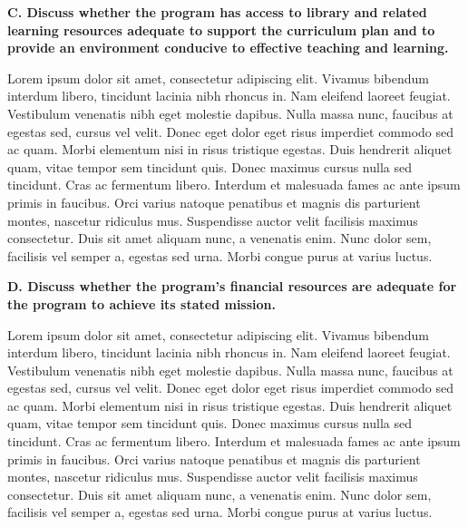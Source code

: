 \textbf{C. Discuss whether the program has access to library and related learning resources adequate to support the curriculum plan and to provide an environment conducive to effective teaching and learning.}

Lorem ipsum dolor sit amet, consectetur adipiscing elit. Vivamus bibendum interdum libero, tincidunt lacinia nibh rhoncus in. Nam eleifend laoreet feugiat. Vestibulum venenatis nibh eget molestie dapibus. Nulla massa nunc, faucibus at egestas sed, cursus vel velit. Donec eget dolor eget risus imperdiet commodo sed ac quam. Morbi elementum nisi in risus tristique egestas. Duis hendrerit aliquet quam, vitae tempor sem tincidunt quis. Donec maximus cursus nulla sed tincidunt. Cras ac fermentum libero. Interdum et malesuada fames ac ante ipsum primis in faucibus. Orci varius natoque penatibus et magnis dis parturient montes, nascetur ridiculus mus. Suspendisse auctor velit facilisis maximus consectetur. Duis sit amet aliquam nunc, a venenatis enim. Nunc dolor sem, facilisis vel semper a, egestas sed urna. Morbi congue purus at varius luctus. 

\textbf{D. Discuss whether the program’s financial resources are adequate for the program to achieve its stated mission.}

Lorem ipsum dolor sit amet, consectetur adipiscing elit. Vivamus bibendum interdum libero, tincidunt lacinia nibh rhoncus in. Nam eleifend laoreet feugiat. Vestibulum venenatis nibh eget molestie dapibus. Nulla massa nunc, faucibus at egestas sed, cursus vel velit. Donec eget dolor eget risus imperdiet commodo sed ac quam. Morbi elementum nisi in risus tristique egestas. Duis hendrerit aliquet quam, vitae tempor sem tincidunt quis. Donec maximus cursus nulla sed tincidunt. Cras ac fermentum libero. Interdum et malesuada fames ac ante ipsum primis in faucibus. Orci varius natoque penatibus et magnis dis parturient montes, nascetur ridiculus mus. Suspendisse auctor velit facilisis maximus consectetur. Duis sit amet aliquam nunc, a venenatis enim. Nunc dolor sem, facilisis vel semper a, egestas sed urna. Morbi congue purus at varius luctus. 
